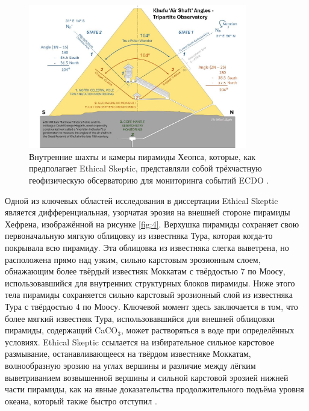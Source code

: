 \documentclass[10pt,twocolumn,letterpaper]{article}
\begin{document}
\begin{figure}[b]
\begin{center}
\includegraphics[width=0.85\textwidth]{shafts.jpg}
\end{center}
   \caption{Внутренние шахты и камеры пирамиды Хеопса, которые, как предполагает Ethical Skeptic, представляли собой трёхчастную геофизическую обсерваторию для мониторинга событий ECDO \cite{28}.}
\label{fig:5}
\end{figure}

Одной из ключевых областей исследования в диссертации Ethical Skeptic является дифференциальная, узорчатая эрозия на внешней стороне пирамиды Хефрена, изображённой на рисунке \ref{fig:4}. Верхушка пирамиды сохраняет свою первоначальную мягкую облицовку из известняка Тура, которая когда-то покрывала всю пирамиду. Эта облицовка из известняка слегка выветрена, но расположена прямо над узким, сильно карстовым эрозионным слоем, обнажающим более твёрдый известняк Моккатам с твёрдостью 7 по Моосу, использовавшийся для внутренних структурных блоков пирамиды. Ниже этого тела пирамиды сохраняется сильно карстовый эрозионный слой из известняка Тура с твёрдостью 4 по Моосу. Ключевой момент здесь заключается в том, что более мягкий известняк Тура, использовавшийся для внешней облицовки пирамиды, содержащий CaCO$_3$, может растворяться в воде при определённых условиях. Ethical Skeptic ссылается на избирательное сильное карстовое размывание, останавливающееся на твёрдом известняке Моккатам, волнообразную эрозию на углах вершины и различие между лёгким выветриванием возвышенной вершины и сильной карстовой эрозией нижней части пирамиды, как на явные доказательства продолжительного подъёма уровня океана, который также быстро отступил \cite{27}.
\end{document}
